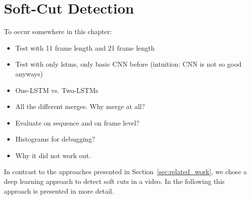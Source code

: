 \FloatBarrier
\section{Soft-Cut Detection}
\label{sec:soft_cut}

To occur somewhere in this chapter:
\begin{itemize}
    \item Test with 11 frame length and 21 frame length
    \item Test with only lstms, only basic CNN before (intuition: CNN is not so good anyways)
    \item One-LSTM vs. Two-LSTMs
    \item All the different merges. Why merge at all?
    \item Evaluate on sequence and on frame level?
    \item Histograms for debugging?
    \item Why it did not work out.
    
\end{itemize}

%
%


In contrast to the approaches presented in Section~\ref{sec:related_work}, we chose a deep learning approach to detect soft cuts in a video.
In the following this approach is presented in more detail.




